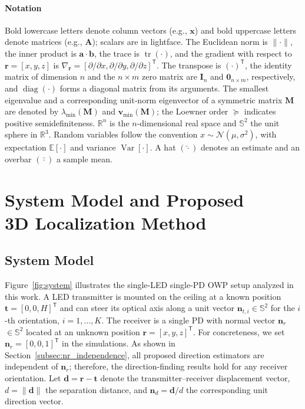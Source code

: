\documentclass[journal]{IEEEtran}
\begin{document}
\paragraph*{Notation}
Bold lowercase letters denote column vectors (e.g., $\mathbf x$) and bold uppercase letters denote matrices (e.g., $\mathbf A$); scalars are in lightface. The Euclidean norm is $\lVert\cdot\rVert$, the inner product is $\mathbf a\!\cdot\!\mathbf b$, the trace is $\operatorname{tr}(\cdot)$, and the gradient with respect to $\mathbf{r}=[x,y,z]$ is $\nabla_{\mathbf r}=[\partial/\partial x,\partial/\partial y,\partial/\partial z]^{\mathsf T}$. The transpose is $(\cdot)^{\mathsf T}$, 
the identity matrix of dimension $n$ and the $n\times m$ zero matrix are $\mathbf{I}_n$ and $\mathbf{0}_{n\times m}$, respectively, and $\operatorname{diag}(\cdot)$ forms a diagonal matrix from its arguments. The smallest eigenvalue and a corresponding unit‐norm eigenvector of a symmetric matrix $\mathbf M$ are denoted by $\lambda_{\min}(\mathbf M)$ and $\mathbf v_{\min}(\mathbf M)$; the Loewner order $\succeq$ indicates positive semidefiniteness. $\mathbb R^n$ is the $n$-dimensional real space and $\mathbb S^{2}$ the unit sphere in $\mathbb R^{3}$. Random variables follow the convention $x\sim\mathcal N(\mu,\sigma^{2})$, with expectation $\mathbb E[\cdot]$ and variance $\operatorname{Var}[\cdot]$. A hat $(\hat{\cdot})$ denotes an estimate and an overbar $(\bar{\cdot})$ a sample mean. 

 
\section{System Model and Proposed \\3D Localization Method}
\label{sec:SystemModel}
\subsection{System Model}

Figure~\ref{fig:system} illustrates the single-LED single-PD OWP setup analyzed in this work. A LED transmitter is mounted on the ceiling at a known position \(\mathbf{t}=[0,0,H]^{\mathsf T}\) and can steer its optical axis along a unit vector \(\mathbf{n}_{t,i}\!\in\!\mathbb{S}^{2}\) for the \(i\)-th orientation, \(i=1,\dots,K\). The receiver is a single PD with normal vector \(\mathbf{n}_{r}\) $\in\mathbb{S}^2$ located at an unknown position \(\mathbf{r}=[x,y,z]^{\mathsf T}\). For concreteness, we set $\mathbf{n}_r=[0,0,1]^{\mathsf T}$ in the simulations. As shown in Section~\ref{subsec:nr_independence}, all proposed direction estimators are independent of $\mathbf{n}_r$; therefore, the direction-finding results hold for any receiver orientation. Let \(\mathbf{d}=\mathbf{r}-\mathbf{t}\) denote the transmitter--receiver displacement vector, \(d=\lVert \mathbf{d}\rVert\) the separation distance, and \(\mathbf{n}_{d}= \mathbf{d}/d\) the corresponding unit direction vector.
\end{document}
